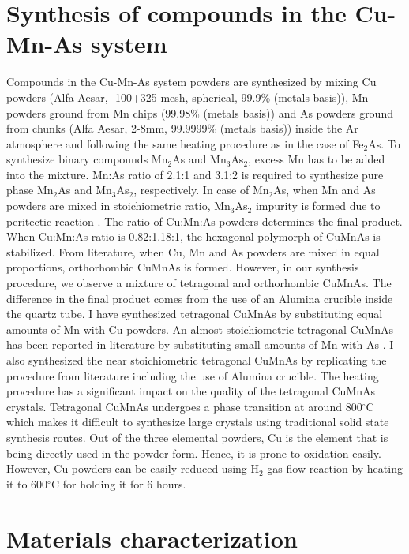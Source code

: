 \documentclass[10pt,doublespacing,edeposit]{uiucthesis2020}
\begin{document}
\begin{mainmatter}
\section{Synthesis of compounds in the Cu-Mn-As system}


Compounds in the Cu-Mn-As system powders are synthesized by mixing Cu powders (Alfa Aesar, -100+325 mesh, spherical, 99.9\% (metals basis)), Mn powders ground from Mn chips (99.98\% (metals basis)) and As powders ground from chunks (Alfa Aesar, 2-8mm, 99.9999\% (metals basis)) inside the Ar atmosphere and following the same heating procedure as in the case of Fe$_2$As. To synthesize binary compounds Mn$_2$As and Mn$_3$As$_2$, excess Mn has to be added into the mixture. Mn:As ratio of 2.1:1 and 3.1:2 is required to synthesize pure phase Mn$_2$As and Mn$_3$As$_2$, respectively. In case of Mn$_2$As, when Mn and As powders are mixed in stoichiometric ratio, Mn$_3$As$_2$ impurity is formed due to peritectic reaction \cite{Yuzuri1960}. The ratio of Cu:Mn:As powders determines the final product. When Cu:Mn:As ratio is 0.82:1.18:1, the hexagonal polymorph of CuMnAs is stabilized. From literature, when Cu, Mn and As powders are mixed in equal proportions, orthorhombic CuMnAs is formed. However, in our synthesis procedure, we observe a mixture of tetragonal and orthorhombic CuMnAs. The difference in the final product comes from the use of an Alumina crucible inside the quartz tube. I have synthesized tetragonal CuMnAs by substituting equal amounts of Mn with Cu powders. An almost stoichiometric tetragonal CuMnAs has been reported in literature by substituting small amounts of Mn with As \cite{Uhlirova2019}. I also synthesized the near stoichiometric tetragonal CuMnAs by replicating the procedure from literature including the use of Alumina crucible. The heating procedure has a significant impact on the quality of the tetragonal CuMnAs crystals. Tetragonal CuMnAs undergoes a phase transition at around 800$^\circ$C which makes it difficult to synthesize large crystals using traditional solid state synthesis routes. Out of the three elemental powders, Cu is the element that is being directly used in the powder form. Hence, it is prone to oxidation easily. However, Cu powders can be easily reduced using H$_2$ gas flow reaction by heating it to 600$^\circ$C for holding it for 6 hours.

\section{Materials characterization}


\end{mainmatter}
\end{document}
